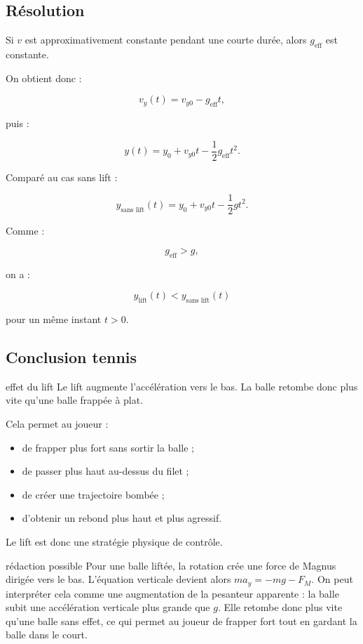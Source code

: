 \documentclass[11pt,a4paper]{article}
\begin{document}
\subsection{Résolution}

Si $v$ est approximativement constante pendant une courte durée, alors $g_{\text{eff}}$ est constante.

On obtient donc :

\[
v_y(t)=v_{y0}-g_{\text{eff}}t,
\]

puis :

\[
y(t)=y_0+v_{y0}t-\frac12g_{\text{eff}}t^2.
\]

Comparé au cas sans lift :

\[
y_{\text{sans lift}}(t)=y_0+v_{y0}t-\frac12gt^2.
\]

Comme :

\[
g_{\text{eff}}>g,
\]

on a :

\[
y_{\text{lift}}(t)<y_{\text{sans lift}}(t)
\]

pour un même instant $t>0$.

\subsection{Conclusion tennis}

\begin{tennis}{effet du lift}
Le lift augmente l'accélération vers le bas. La balle retombe donc plus vite qu'une balle frappée à plat.

Cela permet au joueur :
\begin{itemize}
    \item de frapper plus fort sans sortir la balle ;
    \item de passer plus haut au-dessus du filet ;
    \item de créer une trajectoire bombée ;
    \item d'obtenir un rebond plus haut et plus agressif.
\end{itemize}

Le lift est donc une stratégie physique de contrôle.
\end{tennis}

\begin{oral}{rédaction possible}
Pour une balle liftée, la rotation crée une force de Magnus dirigée vers le bas. L'équation verticale devient alors $ma_y=-mg-F_M$. On peut interpréter cela comme une augmentation de la pesanteur apparente : la balle subit une accélération verticale plus grande que $g$. Elle retombe donc plus vite qu'une balle sans effet, ce qui permet au joueur de frapper fort tout en gardant la balle dans le court.
\end{oral}
\end{document}
